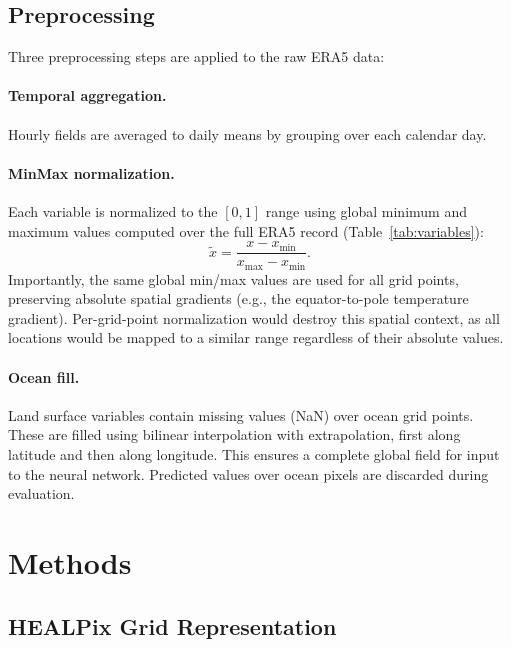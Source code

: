 \documentclass[11pt]{article}
\begin{document}
\subsection{Preprocessing}
\label{sec:preprocessing}

Three preprocessing steps are applied to the raw ERA5 data:

\paragraph{Temporal aggregation.} Hourly fields are averaged to daily means by grouping over each calendar day.

\paragraph{MinMax normalization.} Each variable is normalized to the $[0, 1]$ range using global minimum and maximum values computed over the full ERA5 record (Table~\ref{tab:variables}):
\begin{equation}
    \tilde{x} = \frac{x - x_{\min}}{x_{\max} - x_{\min}}.
    \label{eq:minmax}
\end{equation}
Importantly, the same global min/max values are used for all grid points, preserving absolute spatial gradients (e.g., the equator-to-pole temperature gradient). Per-grid-point normalization would destroy this spatial context, as all locations would be mapped to a similar range regardless of their absolute values.

\paragraph{Ocean fill.} Land surface variables contain missing values (NaN) over ocean grid points. These are filled using bilinear interpolation with extrapolation, first along latitude and then along longitude. This ensures a complete global field for input to the neural network. Predicted values over ocean pixels are discarded during evaluation.

\section{Methods}
\label{sec:methods}

\subsection{HEALPix Grid Representation}
\label{sec:healpix}
\end{document}
